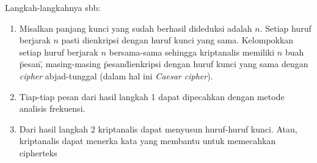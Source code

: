 \documentclass{article}
\begin{document}

Langkah-langkahnya sbb:

\begin{enumerate}
  \item Misalkan panjang kunci yang sudah berhasil dideduksi adalah $n$. Setiap huruf berjarak $n$ pasti dienkripsi dengan huruf kunci yang sama. Kelompokkan setiap huruf berjarak $n$ bersama-sama sehingga kriptanalis memiliki $n$ buah \"pesan\", masing-masing \"pesan\" dienkripsi dengan huruf kunci yang sama dengan \textit{cipher} abjad-tunggal (dalam hal ini \textit{Caesar cipher}).
  \item Tiap-tiap pesan dari hasil langkah 1 dapat dipecahkan dengan metode analisis frekuensi.
  \item Dari hasil langkah 2 kriptanalis dapat menyusun huruf-huruf kunci. Atau, kriptanalis dapat menerka kata yang membantu untuk memecahkan cipherteks
\end{enumerate}
\end{document}
